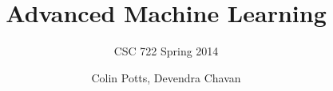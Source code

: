
{

}

\usepackage[english]{babel}
\usepackage[latin1]{inputenc}
\usepackage{times}
\usepackage[T1]{fontenc}


\title[CSC 722 Spring 2014] %
{Advanced Machine Learning}

\subtitle{CSC 722 Spring 2014} %

\author{Colin Potts, Devendra Chavan} %


\def\insertcopyright{$\copyright$ 2014 by Dr. Bahler}
\def\insertslideinfo{\insertshorttitle}

\subject{Advanced Machine Learning}










